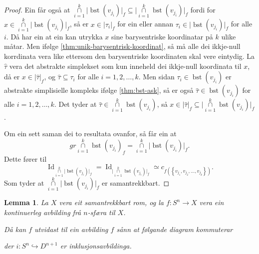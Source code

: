 \documentclass[a4paper, 12pt, norsk]{article}
\theoremstyle{plain}
\newtheorem{lemma}[theorem]{Lemma}
\theoremstyle{definition}
\newcommand{\intersect}{ \mathop{\cap}\limits }
\newcommand{\gr}[1]{ \lvert #1 \rvert } %
\newcommand{\set}[1]{ \left\{ #1 \right\} } %
\DeclareMathOperator{\bst}{bst} %
\DeclareMathOperator{\Id}{Id} %
\begin{document}
\begin{proof}
	Ein får også at \( \intersect_{i = 1}^k \gr{\bst(v_{j_i})}_f \subseteq \gr{\intersect_{i = 1}^k \bst(v_{j_i})}_f \) fordi for \( x \in \intersect_{i = 1}^k \gr{\bst(v_{j_i})}_f \), så er \( x \in \gr{\tau_i}_f \) for ein eller annan \( \tau_i \in \gr{\bst(v_{j_i})}_f \) for alle \( i \). Då har ein at ein kan utrykka \( x \) sine barysentriske koordinatar på \( k \) ulike måtar. Men ifølge \autoref{thm:unik-barysentrisk-koordinat}, så må alle dei ikkje-null korrdinata vera like ettersom den barysentriske koordinaten skal vere eintydig. La \( \hat{\tau} \) vera det abstrakte simplekset som kun inneheld dei ikkje-null koordinata til \( x \), då er \( x \in \gr{\hat{\tau}}_f \), og \( \hat{\tau} \subseteq \tau_i \) for alle \( i = 1, 2, \dots, k \). Men sidan \( \tau_i \in \bst(v_{j_i}) \) er abstrakte simplisielle kompleks ifølge \autoref{thm:bst-ask}, så er også \( \hat{\tau} \in  \bst(v_{j_i}) \) for alle \( i = 1, 2, \dots, k \). Det tyder at \( \hat{\tau} \in \intersect_{i = 1}^k \bst(v_{j_i}) \), så \( x \in \gr{\hat{\tau}}_f \subseteq \gr{\intersect_{i = 1}^k \bst(v_{j_i})}_f \).
	
	Om ein sett saman dei to resultata ovanfor, så får ein at
	\[
		gr{\intersect_{i = 1}^k \bst(v_{j_i})}_f = \intersect_{i = 1}^k \gr{\bst(v_{j_i})}_f.
	\]
	Dette fører til
	\[ 
		\Id_{\intersect_{i = 1}^k \gr{\bst(v_{j_i})}_f} = \Id_{\gr{\intersect_{i = 1}^k \bst(v_{j_i})}_f} \simeq c_{f(\set{v_{j_1}, v_{j_2}, \dots, v_{j_k}})}.
	\]
	Som tyder at \( \intersect_{i = 1}^k \gr{\bst(v_{j_i})}_f \) er samantrekkbart.
\end{proof}

\begin{lemma} \label{thm:utvida-avb}
	La \( X \) vera eit samantrekkbart rom, og la \( f: S^n \to X \) vera ein kontinuerleg avbilding frå \( n \)-sfæra til \( X \). 
	
	Då kan \( f \) utvidast til ein avbilding \( \hat{f} \) sånn at følgande diagram kommuterar

	\begin{center}
	\end{center}
	der \( i: S^n \hookrightarrow D^{n+1} \) er inklusjonsavbildinga.
\end{lemma}
\end{document}

